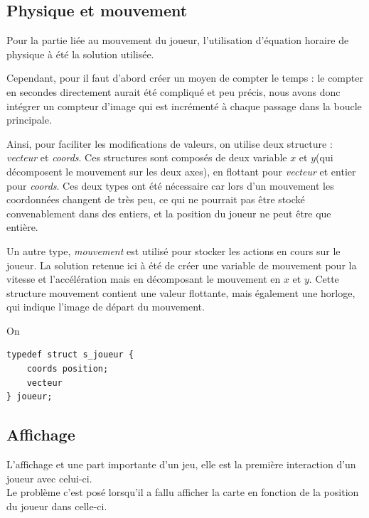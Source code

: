 \documentclass[12pt]{article}
\begin{document}
	
		\subsection{Physique et mouvement}
		
		Pour la partie liée au mouvement du joueur, l'utilisation d'équation horaire de physique à été la solution utilisée.
		
		Cependant, pour il faut d'abord créer un moyen de compter le temps : le compter en secondes directement aurait été compliqué et peu précis, nous avons donc intégrer un compteur d'image qui est incrémenté à chaque passage dans la boucle principale.
		
		\medskip
		
		Ainsi, pour faciliter les modifications de valeurs, on utilise deux structure : \textit{vecteur} et \textit{coords}.
		Ces structures sont composés de deux variable \(x\) et \(y\)(qui décomposent le mouvement sur les deux axes), en flottant pour \textit{vecteur} et entier pour \textit{coords}. Ces deux types ont été nécessaire car lors d'un mouvement les coordonnées changent de très peu, ce qui ne pourrait pas être stocké convenablement dans des entiers, et la position du joueur ne peut être que entière.  
		
		Un autre type, \textit{mouvement} est utilisé pour stocker les actions en cours sur le joueur. La solution retenue ici à été de créer une variable de mouvement pour la vitesse et l'accélération mais en décomposant le mouvement en \(x\) et \(y\). Cette structure mouvement contient une valeur flottante, mais également une horloge, qui indique l'image de départ du mouvement.
		 
		\medskip
		On
		
		\begin{lstlisting}[title=Test]
typedef struct s_joueur {
	coords position;
	vecteur 
} joueur;
		\end{lstlisting}
		
		\newpage
		
		\subsection{Affichage}
		
			L'affichage et une part importante d'un jeu, elle est la première interaction d'un joueur avec celui-ci.\\


			Le problème c'est posé lorsqu'il a fallu afficher la carte en fonction de la position du joueur dans celle-ci.
\end{document}
